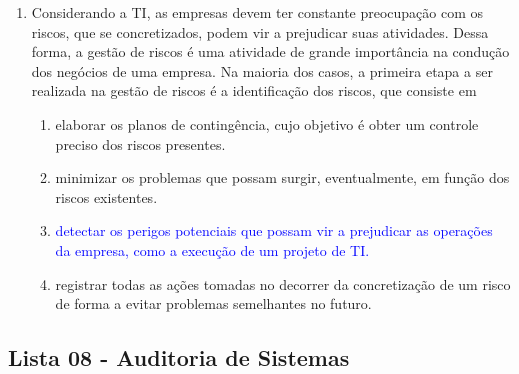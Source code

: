 \documentclass{report}
\begin{document}
\begin{enumerate}
		\item Considerando a TI, as empresas devem ter constante preocupação com os riscos, que se concretizados, podem vir a prejudicar suas atividades. Dessa forma, a gestão de riscos é uma atividade de grande importância na condução dos negócios de uma empresa. Na maioria dos casos, a primeira etapa a ser realizada na gestão de riscos é a identificação dos riscos, que consiste em
		\begin{enumerate}[label=(\alph*)]
			\item elaborar os planos de contingência, cujo objetivo é obter um controle preciso dos riscos presentes.
			\item minimizar os problemas que possam surgir, eventualmente, em função dos riscos existentes.
			\item \textcolor{blue}{detectar os perigos potenciais que possam vir a prejudicar as operações da empresa, como a execução de um projeto de TI.}
			\item registrar todas as ações tomadas no decorrer da concretização de um risco de forma a evitar problemas semelhantes no futuro.
		\end{enumerate}
		
	\end{enumerate}
	
	
	
	
	
	
	
	
	
	
	
	
	\subsection{Lista 08 - Auditoria de Sistemas}
	
\end{document}

